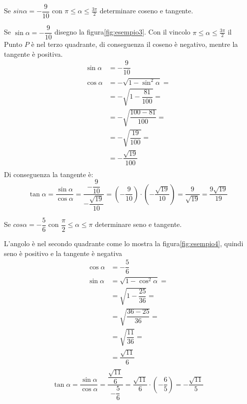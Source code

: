 \begin{esempiot}{}{}
	Se $sin\alpha=-\dfrac{9}{10}$ con $\pi\leq\alpha\leq\frac{3\pi}{2}$ determinare coseno e tangente.
\end{esempiot}
Se $\sin\alpha=-\dfrac{9}{10}$ disegno la figura\nobs\vref{fig:esempio3}. Con il vincolo $\pi\leq\alpha\leq\frac{3\pi}{2}$ il Punto $P$ è nel terzo quadrante, di conseguenza il coseno è negativo, mentre  la tangente è positiva.
\begin{align*}
\sin\alpha&=-\dfrac{9}{10}\\
\cos\alpha&=-\sqrt{1-\sin^2\alpha}=\\
&=-\sqrt{1-\dfrac{81}{100}}=\\
&=-\sqrt{\dfrac{100-81}{100}}=\\
&=-\sqrt{\dfrac{19}{100}}=\\
&=-\dfrac{\sqrt{19}}{100}\\
\end{align*}
Di conseguenza la tangente è:
\[\tan\alpha=\dfrac{\sin\alpha}{\cos\alpha}=\dfrac{-\dfrac{9}{10}}{-\dfrac{\sqrt{19}}{10}}=\left(-\dfrac{9}{10}\right)\cdot\left(-\dfrac{\sqrt{19}}{10}\right)=\dfrac{9}{\sqrt{19}}=\dfrac{9\sqrt{19}}{19}\]
\begin{esempiot}{}{}
	Se $cos\alpha=-\dfrac{5}{6}$ con $\dfrac{\pi}{2}\leq\alpha\leq \pi$ determinare seno e tangente.
\end{esempiot}
L'angolo è nel secondo quadrante come lo mostra la figura\nobs\vref{fig:esempio4}, quindi seno è positivo e la tangente è negativa
\begin{align*}
\cos\alpha&=-\dfrac{5}{6}\\
\sin\alpha&=\sqrt{1-\cos^2\alpha}=\\
&=\sqrt{1-\dfrac{25}{36}}=\\
&=\sqrt{\dfrac{36-25}{36}}=\\
&=\sqrt{\dfrac{11}{36}}=\\
&=\dfrac{\sqrt{11}}{6}\\
\end{align*}
\[\tan\alpha=\dfrac{\sin\alpha}{\cos\alpha}=\dfrac{\dfrac{\sqrt{11}}{6}}{-\dfrac{5}{6}}=\dfrac{\sqrt{11}}{6}\cdot\left(-\dfrac{6}{5}\right)=-\dfrac{\sqrt{11}}{5}\]
